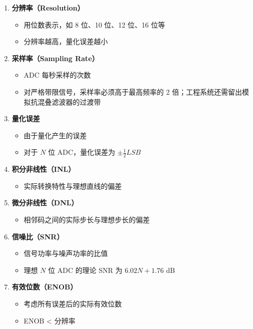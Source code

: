 \begin{enumerate}
  \item \textbf{分辨率（Resolution）}
    \begin{itemize}
      \item 用位数表示，如 8 位、10 位、12 位、16 位等
      \item 分辨率越高，量化误差越小
    \end{itemize}

  \item \textbf{采样率（Sampling Rate）}
    \begin{itemize}
      \item ADC 每秒采样的次数
      \item 对严格带限信号，采样率必须高于最高频率的 2 倍；工程系统还需留出模拟抗混叠滤波器的过渡带
    \end{itemize}

  \item \textbf{量化误差}
    \begin{itemize}
      \item 由于量化产生的误差
      \item 对于 $N$ 位 ADC，量化误差为 $\pm \frac{1}{2} LSB$
    \end{itemize}

  \item \textbf{积分非线性（INL）}
    \begin{itemize}
      \item 实际转换特性与理想直线的偏差
    \end{itemize}

  \item \textbf{微分非线性（DNL）}
    \begin{itemize}
      \item 相邻码之间的实际步长与理想步长的偏差
    \end{itemize}

  \item \textbf{信噪比（SNR）}
    \begin{itemize}
      \item 信号功率与噪声功率的比值
      \item 理想 $N$ 位 ADC 的理论 SNR 为 $6.02N + 1.76$ dB
    \end{itemize}

  \item \textbf{有效位数（ENOB）}
    \begin{itemize}
      \item 考虑所有误差后的实际有效位数
      \item ENOB < 分辨率
    \end{itemize}
\end{enumerate}

